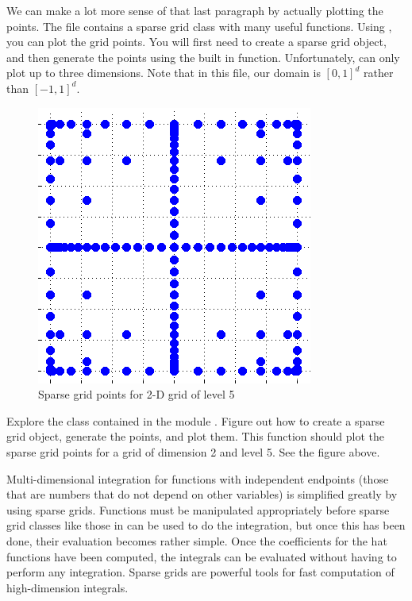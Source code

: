 We can make a lot more sense of that last paragraph by actually plotting the points.  The file  contains a sparse grid class with many useful functions.  Using , you can plot the grid points.  You will first need to create a sparse grid object, and then generate the points using the built in function.  Unfortunately,  can only plot up to three dimensions.  Note that in this file, our domain is $[0,1]^d$ rather than $[-1,1]^d$.

\begin{center}
\begin{figure}
\includegraphics[width=.7\textwidth]{gridpoints.png}
\caption{Sparse grid points for 2-D grid of level 5}
\label{fig:gridpoints}
\end{figure}
\end{center}

\begin{problem}
Explore the  class contained in the module . Figure out how to create a sparse grid object, generate the points, and plot them. This function should plot the sparse grid points for a grid of dimension 2 and level 5. See the figure above.
\end{problem}



Multi-dimensional integration for functions with independent endpoints (those that are numbers that do not depend on other variables) is simplified greatly by using sparse grids.  Functions must be manipulated appropriately before sparse grid classes like those in  can be used to do the integration, but once this has been done, their evaluation becomes rather simple.  Once the coefficients for the hat functions have been computed, the integrals can be evaluated without having to perform any integration.  Sparse grids are powerful tools for fast computation of high-dimension integrals.

